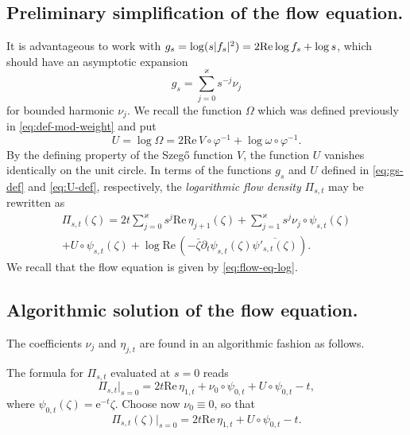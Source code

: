 \documentclass{amsart}
\newcommand{\be}{\begin{equation}}
\newcommand{\ee}{\end{equation}}
\theoremstyle{definition}
\theoremstyle{remark}
\newcommand{\e}{\mathrm{e}}
\renewcommand{\Re}{\mathrm{Re}\,}
\numberwithin{equation}{subsection}
\begin{document}
\subsection{Preliminary simplification of the flow equation.}
\label{ss:reduct-flow}
It is advantageous to work with $g_s=\log(s|f_s|^2)=2\Re\hspace{-1.5pt}\log f_s+\log s$, 
which should have an asymptotic expansion 
\be\label{eq:gs-def}
g_s=\sum_{j=0}^\varkappa s^{-j}\nu_j
\ee
for bounded harmonic $\nu_j$. We recall the function $\Omega$ which was 
defined previously in \eqref{eq:def-mod-weight} and put
\be\label{eq:U-def}
U=\log\Omega=2\Re V\circ\varphi^{-1}+\log\omega\circ\varphi^{-1}.
\ee
By the defining property
of the Szeg\H{o} function $V$, the function $U$ vanishes identically on 
the unit circle.
In terms of the functions $g_s$ and $U$ defined in \eqref{eq:gs-def} 
and \eqref{eq:U-def}, respectively, the {\em logarithmic flow density} 
$\Pi_{s,t}$ may be rewritten as
\begin{multline}\label{eq:flow-density-log}
\Pi_{s,t}(\zeta)= 2t\sum_{j=0}^{\varkappa}s^j\Re \eta_{j+1}(\zeta)
+\sum_{j=1}^{\varkappa}s^j\nu_j\circ\psi_{s,t}(\zeta) 
\\
+ U\circ\psi_{s,t}(\zeta) 
+ \log\Re(-\bar{\zeta}\partial_t\psi_{s,t}(\zeta)
\overline{\psi'_{s,t}(\zeta)}).
\end{multline}
We recall that the flow equation is given by \eqref{eq:flow-eq-log}. 


\bigskip
\subsection{Algorithmic solution of the flow equation.}
\label{ss:alg}
The coefficients
$\nu_j$ and $\eta_{j,t}$
are found in an algorithmic fashion as follows.

\medskip
{} 
The formula for $\Pi_{s,t}$ evaluated at $s=0$ reads
\be
\Pi_{s,t}\vert_{s=0}
=  2t\Re\eta_{1,t} +\nu_0\circ\psi_{0,t}
+ U\circ\psi_{0,t}-t,
\ee
where $\psi_{0,t}(\zeta)=\e^{-t}\zeta$.
Choose now $\nu_0\equiv 0$, so that
\be\label{eq:form-Pi1}
\Pi_{s,t}(\zeta)\vert_{s=0}=2t\Re \eta_{1,t} + U\circ\psi_{0,t}-t.
\ee

\smallskip
\end{document}
